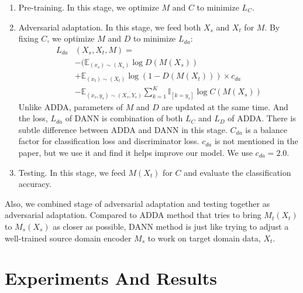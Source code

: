 \documentclass[conference]{IEEEtran}
\begin{document}
\begin{enumerate}
  \item Pre-training. In this stage, we optimize $M$ and $C$ to minimize $L_{C}$.
  \item Adversarial adaptation. In this stage, we feed both $X_s$ and $X_t$ for $M$. By fixing $C$, we optimize $M$ and $D$ to minimize $L_{da}$:
      \begin{equation}\label{dann_da}
        \begin{aligned}
        L_{da} & (X_{s}, X_{t}, M) =  \\
                            &-(\mathbb{E}_{(x_s) \sim (X_s)} \log D(M(X_{s})) \\
                            &+\mathbb{E}_{(x_t) \sim (X_t)} \log (1 - D(M(X_{t}))) \times c_{da} \\
                            &-\mathbb{E}_{(x_s,y_s) \sim (X_s,Y_s)}
                            \sum\limits_{k=1}^{K} \mathbb{I}_{[k=y_s]} \log C(M(X_{s}))
        \end{aligned}
      \end{equation}
      Unlike ADDA, parameters of $M$ and $D$ are updated at the same time. And the loss, $L_{da}$ of DANN is combination of both $L_C$ and $L_D$ of ADDA. There is subtle difference between ADDA and DANN in this stage. $C_{da}$ is a balance factor for classification loss and discriminator loss. $c_{da}$ is not mentioned in the paper, but we use it and find it helps improve our model. We use $c_{da}=2.0$.
  \item Testing. In this stage, we feed $M(X_t)$ for $C$ and evaluate the classification accuracy.
\end{enumerate}
Also, we combined stage of adversarial adaptation and testing together as adversarial adaptation. Compared to ADDA method that tries to bring $M_t(X_t)$ to $M_s(X_s)$ as closer as possible, DANN method is just like trying to adjust a well-trained source domain encoder $M_s$ to work on target domain data, $X_t$.

\section{Experiments And Results}
\end{document}
